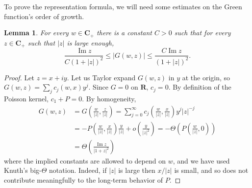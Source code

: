 \documentclass[12pt]{report}
\newcommand{\RR}{\mathbf{R}}
\newcommand{\CC}{\mathbf{C}}
\renewcommand{\Im}{\operatorname{Im}}
\newtheorem{lemma}[theorem]{Lemma}
\theoremstyle{definition}
\begin{document}
To prove the representation formula, we will need some estimates on the Green function's order of growth.
\begin{lemma}
\label{estimate on Green function}
    For every $w \in \CC_+$ there is a constant $C > 0$ such that for every $z \in \CC_+$ such that $|z|$ is large enough,
$$\frac{\Im z}{C(1 + |z|)^2} \leq |G(w, z)| \leq \frac{C \Im z}{(1 + |z|)^2}.$$
\end{lemma}
\begin{proof}
  Let $z = x + iy$. Let us Taylor expand $G(w, z)$ in $y$ at the origin, so $G(w, z) = \sum_j c_j(w, x) y^j$. Since $G = 0$ on $\RR$, $c_j = 0$. By definition of the Poisson kernel, $c_1 + P = 0$. By homogeneity,
\begin{align*}
  G(w, z) &= G\left(\frac{w}{|z|}, \frac{z}{|z|}\right) = \sum_{j=0}^\infty c_j\left(\frac{w}{|z|}, \frac{x}{|z|}\right) y^j |z|^{-j}
  \\&= -P\left(\frac{w}{|z|}, \frac{x}{|z|}\right) \frac{y}{|z|} + o\left(\frac{y}{|z|^2} \right) = -\Theta\left(P\left(\frac{w}{|z|}, 0\right)\right)
  \\&= \Theta \left(\frac{\Im z}{|1 + z|^2}\right)
\end{align*}
  where the implied constants are allowed to depend on $w$, and we have used Knuth's big-$\Theta$ notation. Indeed, if $|z|$ is large then $x/|z|$ is small, and so does not contribute meaningfully to the long-term behavior of $P$.
\end{proof}
\end{document}
